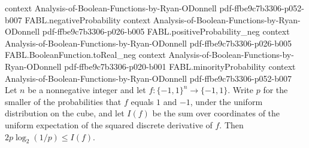 \begin{theorem}
  {context}
  {Analysis-of-Boolean-Functions-by-Ryan-ODonnell}
  {pdf-ffbe9c7b3306-p052-b007}
\proofstep
  {FABL.negativeProbability}
  {context}
  {Analysis-of-Boolean-Functions-by-Ryan-ODonnell}
  {pdf-ffbe9c7b3306-p026-b005}
\proofstep
  {FABL.positiveProbability_neg}
  {context}
  {Analysis-of-Boolean-Functions-by-Ryan-ODonnell}
  {pdf-ffbe9c7b3306-p026-b005}
\proofstep
  {FABL.BooleanFunction.toReal_neg}
  {context}
  {Analysis-of-Boolean-Functions-by-Ryan-ODonnell}
  {pdf-ffbe9c7b3306-p020-b001}
\proofstep
  {FABL.minorityProbability}
  {context}
  {Analysis-of-Boolean-Functions-by-Ryan-ODonnell}
  {pdf-ffbe9c7b3306-p052-b007}
Let $n$ be a nonnegative integer and let $f:\{-1,1\}^n\to\{-1,1\}$. Write $p$ for the
smaller of the probabilities that $f$ equals $1$ and $-1$, under the uniform
distribution on the cube, and let $I(f)$ be the sum over coordinates of the uniform
expectation of the squared discrete derivative of $f$. Then $2p\log_2(1/p)\le I(f)$.
\end{theorem}
